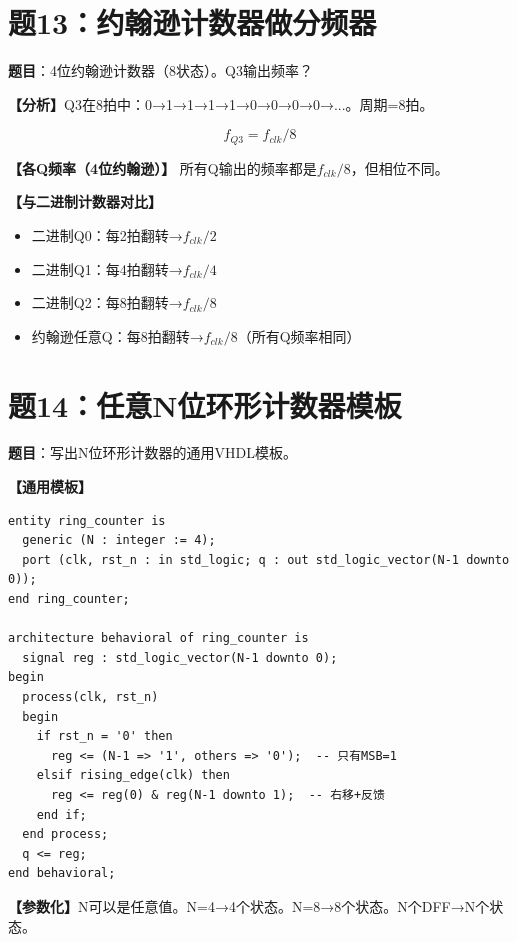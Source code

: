 \section{题13：约翰逊计数器做分频器}

\textbf{题目}：4位约翰逊计数器（8状态）。Q3输出频率？

\begin{solution}[完整解答]

\textbf{【分析】}Q3在8拍中：0→1→1→1→1→0→0→0→0→...。周期=8拍。

$$f_{Q3} = f_{clk} / 8$$

\textbf{【各Q频率（4位约翰逊）】}
所有Q输出的频率都是$f_{clk}/8$，但相位不同。

\textbf{【与二进制计数器对比】}
\begin{itemize}
  \item 二进制Q0：每2拍翻转→$f_{clk}/2$
  \item 二进制Q1：每4拍翻转→$f_{clk}/4$
  \item 二进制Q2：每8拍翻转→$f_{clk}/8$
  \item 约翰逊任意Q：每8拍翻转→$f_{clk}/8$（所有Q频率相同）
\end{itemize}

\end{solution}


\section{题14：任意N位环形计数器模板}

\textbf{题目}：写出N位环形计数器的通用VHDL模板。

\begin{solution}[完整解答]

\textbf{【通用模板】}
\begin{lstlisting}
entity ring_counter is
  generic (N : integer := 4);
  port (clk, rst_n : in std_logic; q : out std_logic_vector(N-1 downto 0));
end ring_counter;

architecture behavioral of ring_counter is
  signal reg : std_logic_vector(N-1 downto 0);
begin
  process(clk, rst_n)
  begin
    if rst_n = '0' then
      reg <= (N-1 => '1', others => '0');  -- 只有MSB=1
    elsif rising_edge(clk) then
      reg <= reg(0) & reg(N-1 downto 1);  -- 右移+反馈
    end if;
  end process;
  q <= reg;
end behavioral;
\end{lstlisting}

\textbf{【参数化】}N可以是任意值。N=4→4个状态。N=8→8个状态。N个DFF→N个状态。

\end{solution}


